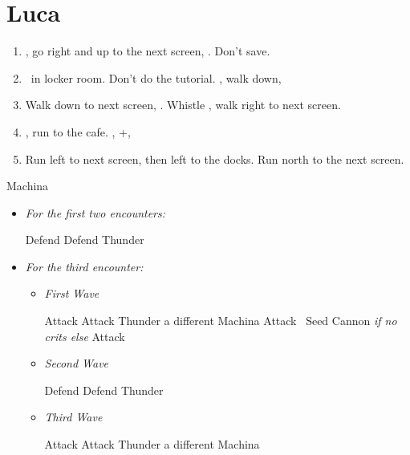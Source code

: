 \chapter{Luca}

\begin{enumerate}
  \item \sd, go right and up to the next screen, \cs[2:30]. Don't save.
  \item \sd\ in locker room. Don't do the tutorial. \sd, walk down, \sd
  \item Walk down to next screen, \sd. Whistle \cs[0:30], walk right to next screen.
  \item \sd, run to the cafe. \sd, \skippablefmv+\cs[1:20], \sd
  \item Run left to next screen, then left to the docks. Run north to the next screen.
\end{enumerate}
\begin{battle}{Machina}
  \begin{itemize}
    \item \textit{For the first two encounters:}
          \begin{itemize}
            \tidusf Defend
            \kimahrif Defend
            \luluf Thunder
          \end{itemize}
    \item \textit{For the third encounter:}
          \begin{itemize}
            \item \textit{First Wave}
                  \begin{itemize}
                    \tidusf Attack
                    \kimahrif Attack
                    \luluf Thunder a different Machina
                    \tidusf Attack
                    \kimahrif \od\ Seed Cannon \textit{if no crits else} Attack
                  \end{itemize}
            \item \textit{Second Wave}
                  \begin{itemize}
                    \tidusf Defend
                    \kimahrif Defend
                    \luluf Thunder
                  \end{itemize}
            \item \textit{Third Wave}
                  \begin{itemize}
                    \tidusf Attack
                    \kimahrif Attack
                    \luluf Thunder a different Machina
                  \end{itemize}
          \end{itemize}
  \end{itemize}
\end{battle}
